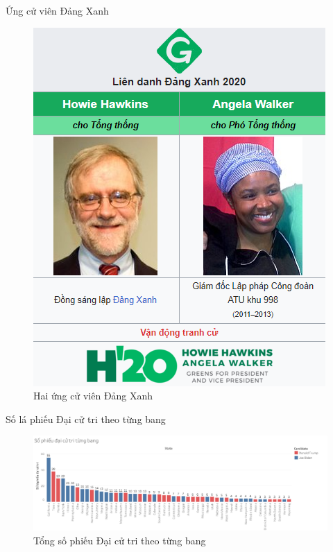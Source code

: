 \documentclass[10pt]{beamer}
\theoremstyle{remark}
\theoremstyle{definition}
\begin{document}
\begin{frame}{Ứng cử viên Đảng Xanh}
    \begin{figure}[h!]
        \centering
        \includegraphics[height=0.8\textheight]{figures/Green_Candidates.png}
        \caption{Hai ứng cử viên Đảng Xanh}
    \end{figure}
\end{frame}

\begin{frame}{Số lá phiếu Đại cử tri theo từng bang}
	\begin{figure}[h!]
        \centering
        \includegraphics[width=\textwidth]{figures/State_Electoral_Votes_Bar_Chart.png}
        \caption{Tổng số phiếu Đại cử tri theo từng bang}
    \end{figure}
\end{frame}
\end{document}
